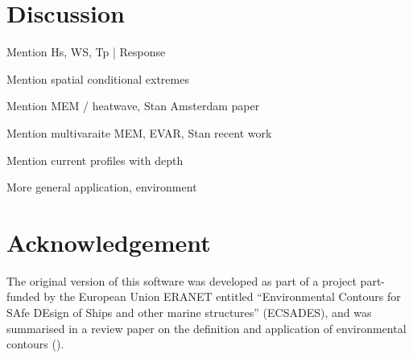 \documentclass[a4paper,fleqn]{cas-sc} %
\begin{document}
\section{Discussion}  
\par Mention Hs, WS, Tp | Response
\par Mention spatial conditional extremes
\par Mention MEM / heatwave, Stan Amsterdam paper
\par Mention multivaraite MEM, EVAR, Stan recent work
\par Mention current profiles with depth
\par More general application, environment

\section{Acknowledgement}
%
The original version of this software was developed as part of a project part-funded by the European Union ERANET entitled “Environmental Contours for SAfe DEsign of Ships and other marine structures” (ECSADES), and was summarised in a review paper on the definition and application of environmental contours (\citealt{RssEA19}).


%

%
\end{document}
